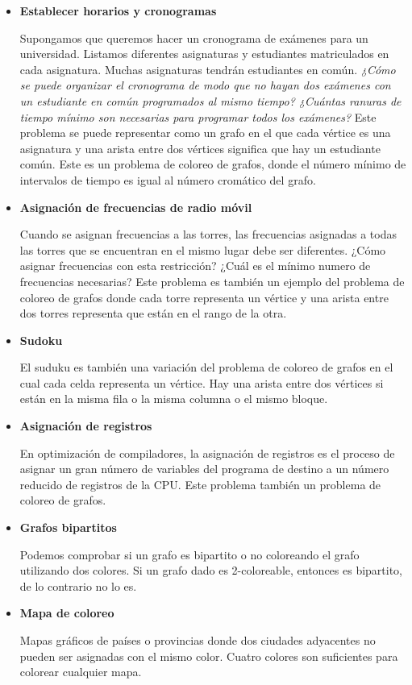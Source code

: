 \documentclass[11pt,a4paper]{article}
\theoremstyle{plain}
\begin{document}
\begin{itemize}

\item{\textbf{{{{Establecer horarios y cronogramas}}}}}

Supongamos que queremos hacer un cronograma de exámenes para un universidad. Listamos diferentes asignaturas y estudiantes matriculados en cada asignatura. Muchas asignaturas tendrán estudiantes en común. \emph{¿Cómo se puede organizar el cronograma de modo que no hayan dos exámenes con un estudiante en común programados al mismo tiempo? ¿Cuántas ranuras de tiempo mínimo son necesarias para programar todos los exámenes?} Este problema se puede representar como un grafo en el que cada vértice es una asignatura y una arista entre dos vértices significa que hay un estudiante común. Este es un problema de coloreo de grafos, donde el número mínimo de intervalos de tiempo es igual al número cromático del grafo.

\item{\textbf{{{Asignación de frecuencias de radio móvil}}}}

Cuando se asignan frecuencias a las torres, las frecuencias asignadas a todas las torres que se encuentran en el mismo lugar debe ser diferentes. ¿Cómo asignar frecuencias con esta restricción? ¿Cuál es el mínimo numero de frecuencias necesarias? Este problema es también un ejemplo del problema de coloreo de grafos donde cada torre representa un vértice y una arista entre dos torres representa que están en el rango de la otra.

\item{\textbf{{{Sudoku}}}}

El suduku es también una variación del problema de coloreo de grafos en el cual cada celda representa un vértice. Hay una arista entre dos vértices si están en la misma fila o la misma columna o el mismo bloque.

\item{\textbf{{{Asignación de registros}}}}

En optimización de compiladores, la asignación de registros es el proceso de asignar un gran número de variables del programa de destino a un número reducido de registros de la CPU. Este problema también un problema de coloreo de grafos.

\item{\textbf{{{Grafos bipartitos}}}}

Podemos comprobar si un grafo es bipartito o no coloreando el grafo utilizando dos colores. Si un grafo dado es 2-coloreable, entonces es bipartito, de lo contrario no lo es. 
 
\item{\textbf{{{Mapa de coloreo}}}}

Mapas gráficos de países o provincias donde dos ciudades adyacentes no pueden ser asignadas con el mismo color. Cuatro colores son suficientes para colorear cualquier mapa\cite {2}.

\end{itemize}
 
\end{document}
